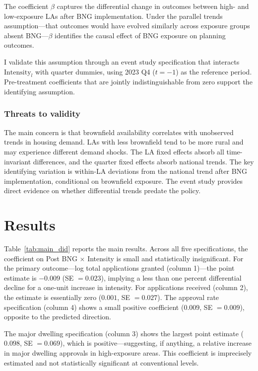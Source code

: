 \documentclass[12pt]{article}
\begin{document}
The coefficient $\beta$ captures the differential change in outcomes between high- and low-exposure LAs after BNG implementation. Under the parallel trends assumption---that outcomes would have evolved similarly across exposure groups absent BNG---$\beta$ identifies the causal effect of BNG exposure on planning outcomes.

I validate this assumption through an event study specification that interacts $\text{Intensity}_l$ with quarter dummies, using 2023 Q4 ($t = -1$) as the reference period. Pre-treatment coefficients that are jointly indistinguishable from zero support the identifying assumption.

\subsubsection*{Threats to validity} The main concern is that brownfield availability correlates with unobserved trends in housing demand. LAs with less brownfield tend to be more rural and may experience different demand shocks. The LA fixed effects absorb all time-invariant differences, and the quarter fixed effects absorb national trends. The key identifying variation is within-LA deviations from the national trend after BNG implementation, conditional on brownfield exposure. The event study provides direct evidence on whether differential trends predate the policy.

\section{Results}



Table~\ref{tab:main_did} reports the main results. Across all five specifications, the coefficient on Post BNG $\times$ Intensity is small and statistically insignificant. For the primary outcome---log total applications granted (column 1)---the point estimate is $-0.009$ (SE $= 0.023$), implying a less than one percent differential decline for a one-unit increase in intensity. For applications received (column 2), the estimate is essentially zero ($0.001$, SE $= 0.027$). The approval rate specification (column 4) shows a small positive coefficient ($0.009$, SE $= 0.009$), opposite to the predicted direction.

The major dwelling specification (column 3) shows the largest point estimate ($0.098$, SE $= 0.069$), which is positive---suggesting, if anything, a relative increase in major dwelling approvals in high-exposure areas. This coefficient is imprecisely estimated and not statistically significant at conventional levels.
\end{document}
